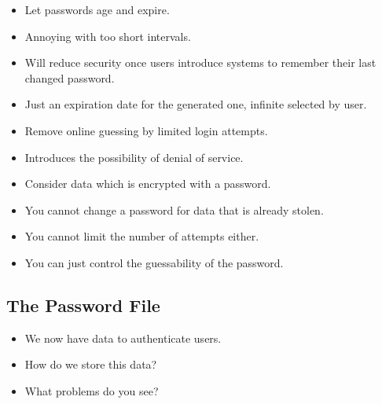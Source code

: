 \begin{frame}
  \begin{example}
    \begin{itemize}
      \item Let passwords age and expire.
      \item Annoying with too short intervals.
      \item Will reduce security once users introduce systems to remember their 
        last changed password.
      \item Just an expiration date for the generated one, infinite selected by
        user.
    \end{itemize}
  \end{example}
\end{frame}

\begin{frame}
  \begin{example}
    \begin{itemize}
      \item Remove online guessing by limited login attempts.
      \item Introduces the possibility of denial of service.
    \end{itemize}
  \end{example}
\end{frame}

\begin{frame}
  \begin{remark}
    \begin{itemize}
      \item Consider data which is encrypted with a password.
      \item You cannot change a password for data that is already stolen.
      \item You cannot limit the number of attempts either.
      \item You can just control the guessability of the password.
    \end{itemize}
  \end{remark}
\end{frame}

\subsection{The Password File}

\begin{frame}
  \begin{exercise}
    \begin{itemize}
      \item We now have data to authenticate users.
      \item How do we store this data?
      \item What problems do you see?
    \end{itemize}
  \end{exercise}
\end{frame}

